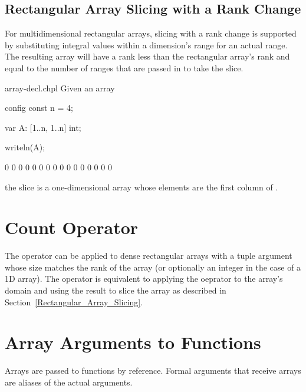 \subsection{Rectangular Array Slicing with a Rank Change}
\label{Rectangular_Array_Slicing_With_Rank_Change}

For multidimensional rectangular arrays, slicing with a rank change is
supported by substituting integral values within a dimension's range
for an actual range.  The resulting array will have a rank less than
the rectangular array's rank and equal to the number of ranges that are
passed in to take the slice.

\begin{chapelexample}{array-decl.chpl}
Given an array
\begin{chapelpre}
config const n = 4;
\end{chapelpre}
\begin{chapel}
var A: [1..n, 1..n] int;
\end{chapel}
\begin{chapelpost}
writeln(A);
\end{chapelpost}
\begin{chapeloutput}
0 0 0 0
0 0 0 0
0 0 0 0
0 0 0 0
\end{chapeloutput}
the slice  is a one-dimensional array whose elements
are the first column of .
\end{chapelexample}


\section{Count Operator}
\label{Count_Operator_Arrays}
The \chpl{#} operator can be applied to dense rectangular arrays with
a tuple argument whose size matches the rank of the array (or
optionally an integer in the case of a 1D array).  The operator is
equivalent to applying the \chpl{#} oeprator to the array's domain and
using the result to slice the array as described in
Section~\ref{Rectangular_Array_Slicing}.


\section{Array Arguments to Functions}
\label{Array_Arguments_To_Functions}

Arrays are passed to functions by reference.  Formal arguments that
receive arrays are aliases of the actual arguments.

